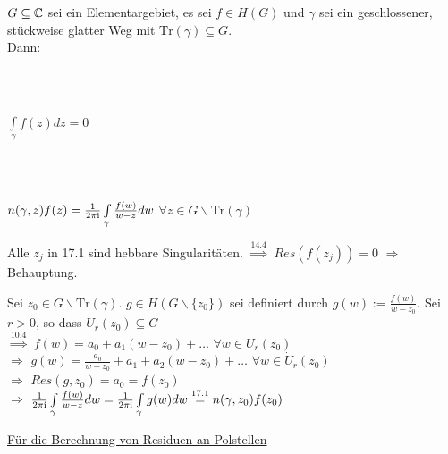 \documentclass[a4paper,twoside,DIV15,BCOR12mm]{scrbook}
\def\Tr{\text{Tr}}
\def\wegint{\ensuremath{\int\limits_\gamma}}
\def\ie{\rm i}
\begin{document}
\begin{folgerung} 
  $G \subseteq \mathbb{C}$ sei ein Elementargebiet, es sei $f \in H(G)$ und $\gamma$ sei
  ein geschlossener, st\"uckweise glatter Weg mit $\Tr(\gamma) \subseteq G$.\\
  Dann: 
  \begin{liste}
    \item {} \\ \\
    \centerline{$\wegint f(z) dz = 0$}
    \item {} \\ \\
    \centerline{$n(\gamma, z) f(z) = \frac{1}{2 \pi \ie} \wegint \frac{f(w)}{w-z}
    dw$ $\forall z \in G \backslash \text{Tr}(\gamma)$}
  \end{liste}
\end{folgerung}

\begin{beweis}
  \begin{liste}
    \item Alle $z_j$ in 17.1 sind hebbare Singularit\"aten.
    $\stackrel{\text{14.4}}{\Rightarrow}$ $Res(f(z_j)) = 0$ $\Rightarrow$
    Behauptung. 
    \item Sei $z_0 \in G \backslash \text{Tr}(\gamma)$. $g \in H(G \backslash
    \{z_0\})$ sei definiert durch $g(w) := \frac{f(w)}{w-z_0}$. Sei $r > 0$, so dass
    $U_r(z_0) \subseteq G$\\ $\stackrel{10.4}{\Rightarrow}$ $f(w) = a_0+a_1(w-z_0) +
    \ldots$ $\forall w \in U_r(z_0)$ \\ $\Rightarrow $ $g(w) = \frac{a_0}{w-z_0} +
    a_1 + a_2(w-z_0) + \ldots $ $\forall w \in \dot{U}_r(z_0)$ \\
    $\Rightarrow $ $Res(g, z_0) = a_0 = f(z_0)$ \\ 
    $\Rightarrow$ $\frac{1}{2 \pi \ie} \wegint \frac{f(w)}{w-z} dw = \frac{1}{2 \pi \ie
    } \wegint g(w) dw \stackrel{\text{17.1}}{=} n(\gamma, z_0) f(z_0)$
  \end{liste}
\end{beweis}

\underline{F\"ur die Berechnung von Residuen an Polstellen}
\end{document}
